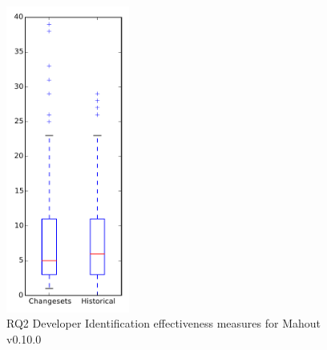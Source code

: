 
\begin{figure}[t]
\centering
\includegraphics[width=0.36\textwidth]{figures/dit/rq2_mahout}
\caption{RQ2 Developer Identification effectiveness measures for Mahout v0.10.0}
\label{fig:dit:rq2:mahout}
\end{figure}
